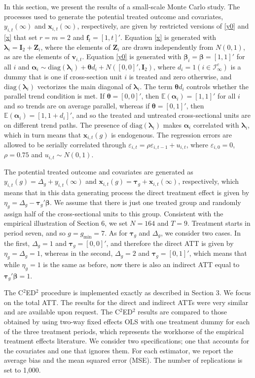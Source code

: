 \documentclass[12pt,fleqn]{article}
\def\*#1{\mathbf{#1}}
\def\+#1{\boldsymbol{#1}}
\begin{document}
In this section, we present the results of a small-scale Monte Carlo study. The processes used to generate the potential treated outcome and covariates, $y_{i,t}(\infty)$ and $\*x_{i,t}(\infty)$, respectively, are given by restricted versions of \eqref{y0} and \eqref{x} that set $r=m=2$ and $\*f_t = [1,t]'$. Equation \eqref{x} is generated with $\+\lambda_i = \*I_2 + \*Z_i$, where the elements of $\*Z_i$ are drawn independently from $N(0,1)$, as are the elements of $\*v_{i,t}$. Equation \eqref{y0} is generated with $\+\beta_i = \+\beta = [1, 1]'$ for all $i$ and $\+\alpha_i \sim \mathrm{diag}(\+\lambda_i) + \+\theta d_i + N([0,0]', \*I_2)$, where $d_i = 1(i \in \mathcal{I}_\infty^c)$ is a dummy that is one if cross-section unit $i$ is treated and zero otherwise, and $\mathrm{diag}(\+\lambda_i)$ vectorizes the main diagonal of $\+\lambda_i$. The term $\+\theta d_i$ controls whether the parallel trend condition is met. If $\+\theta = [0,0]'$, then $\mathbb{E}(\+\alpha_i) = [1,1]'$ for all $i$ and so trends are on average parallel, whereas if $\+\theta = [0,1]'$, then $\mathbb{E}(\+\alpha_i) = [1,1+d_i]'$, and so the treated and untreated cross-sectional units are on different trend paths. The presence of $\mathrm{diag}(\+\lambda_i)$ makes $\+\alpha_i$ correlated with $\+\lambda_i$, which in turn means that $\*x_{i,t}(g)$ is endogenous. The regression errors are allowed to be serially correlated through $\varepsilon_{i,t} = \rho \varepsilon_{i,t-1} + u_{i,t}$, where $\varepsilon_{i,0} = 0$, $\rho = 0.75$ and $u_{i,t} \sim N(0,1)$.

The potential treated outcome and covariates are generated as $y_{i,t}(g) = \Delta_g + y_{i,t}(\infty)$ and $\*x_{i,t}(g) = \+\tau_g + \*x_{i,t}(\infty)$, respectively, which means that in this data generating process the direct treatment effect is given by $\eta_g =  \Delta_g - \+\tau_g'\+\beta$. We assume that there is just one treated group and randomly assign half of the cross-sectional units to this group. Consistent with the empirical illustration of Section 6, we set $N=164$ and $T=9$. Treatment starts in period seven, and so $g = g_{\min} = 7$. As for $\+\tau_g$ and $\Delta_g$, we consider two cases. In the first, $\Delta_g = 1$ and $\+\tau_g = [0,0]'$, and therefore the direct ATT is given by $\eta_g = \Delta_g = 1$, whereas in the second, $\Delta_g = 2$ and $\+\tau_g = [0,1]'$, which means that while $\eta_g = 1$ is the same as before, now there is also an indirect ATT equal to $\+\tau_g'\+\beta = 1$.

The C$^2$ED$^2$ procedure is implemented exactly as described in Section 3. We focus on the total ATT. The results for the direct and indirect ATTs were very similar and are available upon request. The C$^2$ED$^2$ results are compared to those obtained by using two-way fixed effects OLS with one treatment dummy for each of the three treatment periods, which represents the workhorse of the empirical treatment effects literature. We consider two specifications; one that accounts for the covariates and one that ignores them. For each estimator, we report the average bias and the mean squared error (MSE). The number of replications is set to 1,000.
\end{document}
